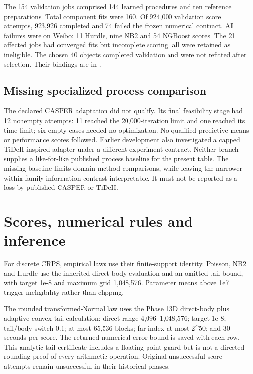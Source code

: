 The 154 validation jobs comprised 144 learned procedures and ten reference preparations. Total component fits were 160. Of 924,000 validation score attempts, 923,926 completed and 74 failed the frozen numerical contract. All failures were on Weibo: 11 Hurdle, nine NB2 and 54 NGBoost scores. The 21 affected jobs had converged fits but incomplete scoring; all were retained as ineligible. The chosen 40 objects completed validation and were not refitted after selection. Their bindings are in .

\hypertarget{s2.3-missing-specialized-process-comparison}{%
\subsection{Missing specialized process comparison}\label{s2.3-missing-specialized-process-comparison}}

The declared CASPER adaptation did not qualify. Its final feasibility stage had 12 nonempty attempts: 11 reached the 20,000-iteration limit and one reached its time limit; six empty cases needed no optimization. No qualified predictive means or performance scores followed. Earlier development also investigated a capped TiDeH-inspired adapter under a different experiment contract. Neither branch supplies a like-for-like published process baseline for the present table. The missing baseline limits domain-method comparisons, while leaving the narrower within-family information contrast interpretable. It must not be reported as a loss by published CASPER or TiDeH.

\hypertarget{scores-numerical-rules-and-inference}{%
\section{Scores, numerical rules and inference}\label{scores-numerical-rules-and-inference}}

For discrete CRPS, empirical laws use their finite-support identity. Poisson, NB2 and Hurdle use the inherited direct-body evaluation and an omitted-tail bound, with target 1e-8 and maximum grid 1,048,576. Parameter means above 1e7 trigger ineligibility rather than clipping.

The rounded transformed-Normal law uses the Phase 13D direct-body plus adaptive convex-tail calculation: direct range 4,096--1,048,576; target 1e-8; tail/body switch 0.1; at most 65,536 blocks; far index at most 2\^{}50; and 30 seconds per score. The returned numerical error bound is saved with each row. This analytic tail certificate includes a floating-point guard but is not a directed-rounding proof of every arithmetic operation. Original unsuccessful score attempts remain unsuccessful in their historical phases.

